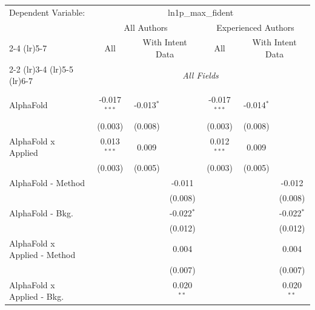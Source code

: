 \begingroup
\centering
\begin{tabular}{lcccccc}
   \tabularnewline \midrule \midrule
   Dependent Variable: & \multicolumn{6}{c}{ln1p\_max\_fident}\\
 & \multicolumn{3}{c}{All Authors} & \multicolumn{3}{c}{Experienced Authors} \\
\cmidrule(lr){2-4} \cmidrule(lr){5-7}
 & \multicolumn{1}{c}{All} & \multicolumn{2}{c}{With Intent Data} & \multicolumn{1}{c}{All} & \multicolumn{2}{c}{With Intent Data} \\
\cmidrule(lr){2-2} \cmidrule(lr){3-4} \cmidrule(lr){5-5} \cmidrule(lr){6-7}
 & \multicolumn{6}{c}{\textit{All Fields}} \\ \\
   AlphaFold                      & -0.017$^{***}$ & -0.013$^{*}$ &              & -0.017$^{***}$ & -0.014$^{*}$ &   \\   
                                  & (0.003)        & (0.008)      &              & (0.003)        & (0.008)      &   \\   
   AlphaFold x Applied            & 0.013$^{***}$  & 0.009        &              & 0.012$^{***}$  & 0.009        &   \\   
                                  & (0.003)        & (0.005)      &              & (0.003)        & (0.005)      &   \\   
   AlphaFold - Method             &                &              & -0.011       &                &              & -0.012\\   
                                  &                &              & (0.008)      &                &              & (0.008)\\   
   AlphaFold - Bkg.               &                &              & -0.022$^{*}$ &                &              & -0.022$^{*}$\\   
                                  &                &              & (0.012)      &                &              & (0.012)\\   
   AlphaFold x Applied - Method   &                &              & 0.004        &                &              & 0.004\\   
                                  &                &              & (0.007)      &                &              & (0.007)\\   
   AlphaFold x Applied - Bkg.     &                &              & 0.020$^{**}$ &                &              & 0.020$^{**}$\\   

\end{tabular}
